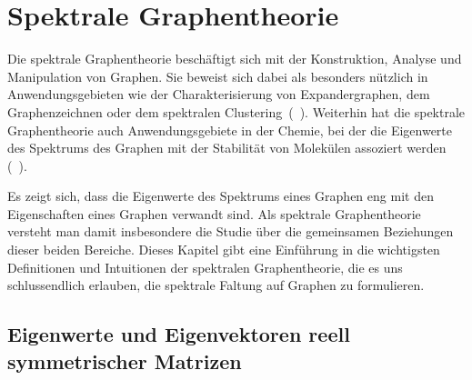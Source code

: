 \section{Spektrale Graphentheorie}
\label{spektrale_graphentheorie}

Die spektrale Graphentheorie beschäftigt sich mit der Konstruktion, Analyse und Manipulation von Graphen.
Sie beweist sich dabei als besonders nützlich in Anwendungsgebieten wie der Charakterisierung von Expandergraphen, dem Graphenzeichnen oder dem spektralen Clustering~(\vgl{}~\cite{Shuman}).
Weiterhin hat die spektrale Graphentheorie \zB{} auch Anwendungsgebiete in der Chemie, bei der die Eigenwerte des Spektrums des Graphen mit der Stabilität von Molekülen assoziert werden (\vgl{}~\cite{Chung}).

Es zeigt sich, dass die Eigenwerte des Spektrums eines Graphen eng mit den Eigenschaften eines Graphen verwandt sind.
Als spektrale Graphentheorie versteht man damit insbesondere die Studie über die gemeinsamen Beziehungen dieser beiden Bereiche.
Dieses Kapitel gibt eine Einführung in die wichtigsten Definitionen und Intuitionen der spektralen Graphentheorie, die es uns schlussendlich erlauben, die spektrale Faltung auf Graphen zu formulieren.

\subsection{Eigenwerte und Eigenvektoren reell symmetrischer Matrizen}
\label{eigenwerte_symmetrischer_matrizen}

